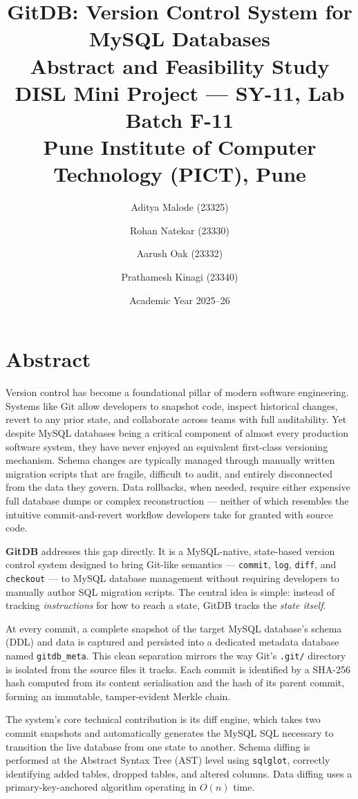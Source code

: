 \documentclass[12pt, a4paper]{article}
\title{
    \textbf{GitDB: Version Control System for MySQL Databases} \\[0.4em]
    \large Abstract and Feasibility Study \\[0.4em]
    \normalsize DISL Mini Project --- SY-11, Lab Batch F-11 \\
    Pune Institute of Computer Technology (PICT), Pune
}
\author{
    Aditya Malode (23325) \and
    Rohan Natekar (23330) \and
    Aarush Oak (23332) \and
    Prathamesh Kinagi (23340)
}
\date{Academic Year 2025--26}
\begin{document}
\maketitle
\thispagestyle{empty}

\section{Abstract}

Version control has become a foundational pillar of modern software engineering.
Systems like Git allow developers to snapshot code, inspect historical changes,
revert to any prior state, and collaborate across teams with full auditability.
Yet despite MySQL databases being a critical component of almost every production
software system, they have never enjoyed an equivalent first-class versioning
mechanism. Schema changes are typically managed through manually written migration
scripts that are fragile, difficult to audit, and entirely disconnected from the
data they govern. Data rollbacks, when needed, require either expensive full
database dumps or complex reconstruction --- neither of which resembles the
intuitive commit-and-revert workflow developers take for granted with source code.

\textbf{GitDB} addresses this gap directly. It is a MySQL-native, state-based
version control system designed to bring Git-like semantics --- \texttt{commit},
\texttt{log}, \texttt{diff}, and \texttt{checkout} --- to MySQL database management
without requiring developers to manually author SQL migration scripts. The central
idea is simple: instead of tracking \textit{instructions} for how to reach a state,
GitDB tracks the \textit{state itself}.

At every commit, a complete snapshot of the target MySQL database's schema (DDL)
and data is captured and persisted into a dedicated metadata database named
\texttt{gitdb\_meta}. This clean separation mirrors the way Git's \texttt{.git/}
directory is isolated from the source files it tracks. Each commit is identified
by a SHA-256 hash computed from its content serialisation and the hash of its
parent commit, forming an immutable, tamper-evident Merkle chain.

The system's core technical contribution is its diff engine, which takes two
commit snapshots and automatically generates the MySQL SQL necessary to transition
the live database from one state to another. Schema diffing is performed at the
Abstract Syntax Tree (AST) level using \texttt{sqlglot}, correctly identifying
added tables, dropped tables, and altered columns. Data diffing uses a
primary-key-anchored algorithm operating in $O(n)$ time.
\end{document}
